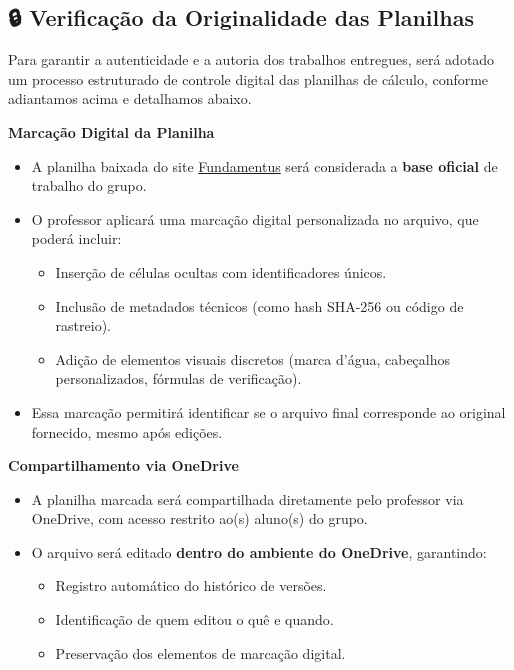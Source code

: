 \documentclass[
  a4paper,
]{book}
\providecommand{\tightlist}{%
  \setlength{\itemsep}{0pt}\setlength{\parskip}{0pt}}\usepackage{longtable,booktabs,array}
\begin{document}
\subsection{🔒 Verificação da Originalidade das
Planilhas}\label{verificauxe7uxe3o-da-originalidade-das-planilhas}

Para garantir a autenticidade e a autoria dos trabalhos entregues, será
adotado um processo estruturado de controle digital das planilhas de
cálculo, conforme adiantamos acima e detalhamos abaixo.

\textbf{Marcação Digital da Planilha}

\begin{itemize}
\item
  A planilha baixada do site
  \href{https://www.fundamentus.com.br}{Fundamentus} será considerada a
  \textbf{base oficial} de trabalho do grupo.
\item
  O professor aplicará uma marcação digital personalizada no arquivo,
  que poderá incluir:

  \begin{itemize}
  \tightlist
  \item
    Inserção de células ocultas com identificadores únicos.
  \item
    Inclusão de metadados técnicos (como hash SHA-256 ou código de
    rastreio).
  \item
    Adição de elementos visuais discretos (marca d'água, cabeçalhos
    personalizados, fórmulas de verificação).
  \end{itemize}
\item
  Essa marcação permitirá identificar se o arquivo final corresponde ao
  original fornecido, mesmo após edições.
\end{itemize}

\textbf{Compartilhamento via OneDrive}

\begin{itemize}
\item
  A planilha marcada será compartilhada diretamente pelo professor via
  OneDrive, com acesso restrito ao(s) aluno(s) do grupo.
\item
  O arquivo será editado \textbf{dentro do ambiente do OneDrive},
  garantindo:

  \begin{itemize}
  \tightlist
  \item
    Registro automático do histórico de versões.
  \item
    Identificação de quem editou o quê e quando.
  \item
    Preservação dos elementos de marcação digital.
  \end{itemize}
\end{itemize}
\end{document}

